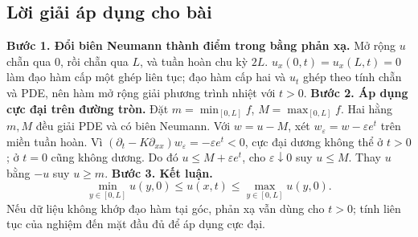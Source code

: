 \documentclass[10pt,a4paper]{article}
\begin{document}
\subsection*{Lời giải áp dụng cho bài}
\textbf{Bước 1. Đổi biên Neumann thành điểm trong bằng phản xạ.} Mở rộng $u$ chẵn qua $0$, rồi chẵn qua $L$, và tuần hoàn chu kỳ $2L$. $u_x(0,t)=u_x(L,t)=0$ làm đạo hàm cấp một ghép liên tục; đạo hàm cấp hai và $u_t$ ghép theo tính chẵn và PDE, nên hàm mở rộng giải phương trình nhiệt với $t>0$.
\textbf{Bước 2. Áp dụng cực đại trên đường tròn.} Đặt $m=\min_{[0,L]}f$, $M=\max_{[0,L]}f$. Hai hằng $m,M$ đều giải PDE và có biên Neumann. Với $w=u-M$, xét $w_\varepsilon=w-\varepsilon e^t$ trên miền tuần hoàn. Vì $(\partial_t-K\partial_{xx})w_\varepsilon=-\varepsilon e^t<0$, cực đại dương không thể ở $t>0$; ở $t=0$ cũng không dương. Do đó $u\le M+\varepsilon e^t$, cho $\varepsilon\downarrow0$ suy $u\le M$. Thay $u$ bằng $-u$ suy $u\ge m$.
\textbf{Bước 3. Kết luận.}
\[\min_{y\in[0,L]}u(y,0)\le u(x,t)\le\max_{y\in[0,L]}u(y,0).\]
Nếu dữ liệu không khớp đạo hàm tại góc, phản xạ vẫn dùng cho $t>0$; tính liên tục của nghiệm đến mặt đầu đủ để áp dụng cực đại.
\end{document}
